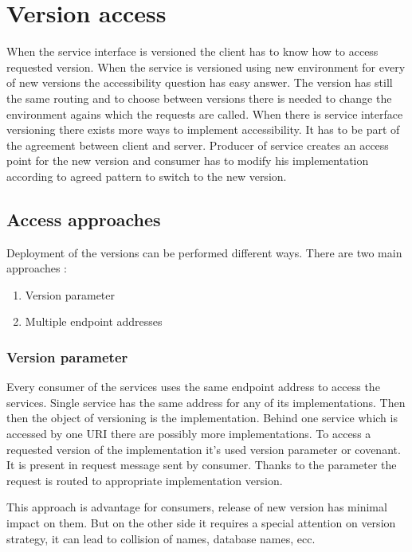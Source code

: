 \chapter{Version access}
\label{chap:versionaccess}

When the service interface is versioned the client has to know how to access requested version. When the service is versioned using new environment for every of new versions the accessibility question has easy answer. The version has still the same routing and to choose between versions there is needed to change the environment agains which the requests are called. When there is service interface versioning there exists more ways to implement accessibility. It has to be part of the agreement between client and server. Producer of service creates an access point for the new version and consumer has to modify his implementation according to agreed pattern to switch to the new version. 

\section{Access approaches}
Deployment of the versions can be performed different ways. There are two main approaches \cite{applied-soa}:
\begin{enumerate}
  \item Version parameter
  \item Multiple endpoint addresses
\end{enumerate}

\subsection{Version parameter}
Every consumer of the services uses the same endpoint address to access the services. Single service has the same address for any of its implementations. Then then the object of versioning is the implementation. Behind one service which is accessed by one URI there are possibly more implementations.
To access a requested version of the implementation it's used version parameter or covenant. It is present in request message sent by consumer. Thanks to the parameter the request is routed to appropriate implementation version.

This approach is advantage for consumers, release of new version has minimal impact on them. But on the other side it requires a special attention on version strategy, it can lead to collision of names, database names, ecc.

